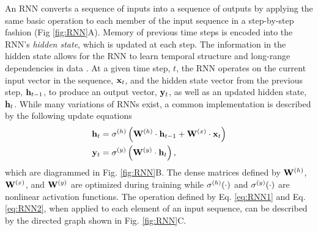 An RNN converts a sequence of inputs into a sequence of outputs by applying the same basic operation to each member of the input sequence in a step-by-step fashion (Fig \ref{fig:RNN}A). 
Memory of previous time steps is encoded into the RNN's \textit{hidden state}, which is updated at each step.
The information in the hidden state allows for the RNN to learn temporal structure and long-range dependencies in data \cite{elman1990finding, jordan1997serial}.
At a given time step, $t$, the RNN operates on the current input vector in the sequence, $\mathbf{x}_t$, and the hidden state vector from the previous step, $\mathbf{h}_{t-1}$, to produce an output vector, $\mathbf{y}_t$, as well as an updated hidden state, $\mathbf{h}_t$. 
%
While many variations of RNNs exist, a common implementation \cite{Goodfellow-et-al-2016} is described by the following update equations
%
\begin{align}
    \mathbf{h}_t &= \sigma^{(h)} \left(\mathbf{W}^{(h)} \cdot \mathbf{h}_{t-1} + \mathbf{W}^{(x)} \cdot \mathbf{x}_t \right)
    \label{eq:RNN1} \\
    \mathbf{y}_t &= \sigma^{(y)} \left(\mathbf{W}^{(y)} \cdot \mathbf{h}_t\right),
    \label{eq:RNN2}
\end{align}
%
which are diagrammed in Fig. \ref{fig:RNN}B. 
The dense matrices defined by $\mathbf{W}^{(h)}$, $\mathbf{W}^{(x)}$, and $\mathbf{W}^{(y)}$ are optimized during training while $\sigma^{(h)}{\left(\cdot \right)}$ and $\sigma^{(y)}{\left(\cdot \right)}$ are nonlinear activation functions.
The operation defined by Eq. \ref{eq:RNN1} and Eq. \ref{eq:RNN2}, when applied to each element of an input sequence, can be described by the directed graph shown in Fig. \ref{fig:RNN}C.

